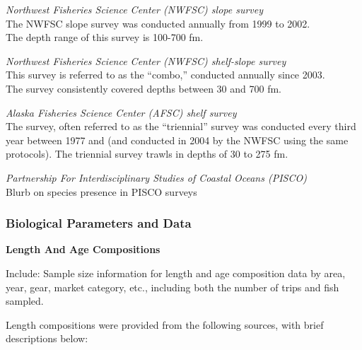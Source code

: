 \documentclass[12pt,]{article}
\begin{document}
\emph{Northwest Fisheries Science Center (NWFSC) slope survey}\\
The NWFSC slope survey was conducted annually from 1999 to 2002.\\
The depth range of this survey is 100-700 fm.

\emph{Northwest Fisheries Science Center (NWFSC) shelf-slope survey}\\
This survey is referred to as the ``combo,'' conducted annually since
2003.\\
The survey consistently covered depths between 30 and 700 fm.

\emph{Alaska Fisheries Science Center (AFSC) shelf survey}\\
The survey, often referred to as the ``triennial'' survey was conducted
every third year between 1977 and (and conducted in 2004 by the NWFSC
using the same protocols). The triennial survey trawls in depths of 30
to 275 fm.

\emph{Partnership For Interdisciplinary Studies of Coastal Oceans
(PISCO)}\\
Blurb on species presence in PISCO surveys

\subsubsection{Biological Parameters and
Data}\label{biological-parameters-and-data}

\textbf{Length And Age Compositions}

Include: Sample size information for length and age composition data by
area, year, gear, market category, etc., including both the number of
trips and fish sampled.

Length compositions were provided from the following sources, with brief
descriptions below:
\end{document}
